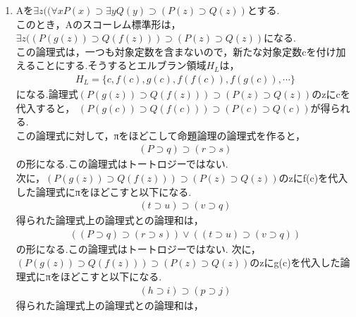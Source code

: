 \documentclass[11pt,dvipdfmx]{jreport}
\begin{document}
\begin{enumerate}
\item
Aを$\exists z ((\forall x P(x) \supset \exists y Q(y) \supset (P(z) \supset Q(z)) $とする. \\
このとき，Aのスコーレム標準形は， $ \exists z (( P(g(z)) \supset Q(f(z))) \supset (P(z) \supset Q(z))$になる.\\
この論理式は，一つも対象定数を含まないので，新たな対象定数cを付け加えることにする.そうするとエルブラン領域$H_L$は，\\
\begin{equation*}
  \begin{array}{lll}
    & H_L = \{c,f(c),g(c),f(f(c)),f(g(c)),\cdots \} & 
  \end{array}
\end{equation*}
になる.論理式$(P(g(z)) \supset Q(f(z))) \supset (P(z) \supset Q(z))$のzにcを代入すると，
$(P(g(c)) \supset Q(f(c))) \supset (P(c) \supset Q(c))$が得られる.\\
この論理式に対して，πをほどこして命題論理の論理式を作ると，
\begin{equation*}
  \begin{array}{lll}
    & (P \supset q) \supset (r \supset s) & 
  \end{array}
\end{equation*}
の形になる.この論理式はトートロジーではない.\\
次に，$(P(g(z)) \supset Q(f(z))) \supset (P(z) \supset Q(z))$のzにf(c)を代入した論理式にπをほどこすと以下になる.
\begin{equation*}
  \begin{array}{lll}
    & (t \supset u) \supset (v \supset q) & 
  \end{array}
\end{equation*}
得られた論理式上の論理式との論理和は，
\begin{equation*}
  \begin{array}{lll}
    & ((P \supset q) \supset (r \supset s)) \lor ((t \supset u) \supset (v \supset q)) & 
  \end{array}
\end{equation*}
の形になる.この論理式はトートロジーではない.
次に，$(P(g(z)) \supset Q(f(z))) \supset (P(z) \supset Q(z))$のzにg(c)を代入した論理式にπをほどこすと以下になる.
\begin{equation*}
  \begin{array}{lll}
    & (h \supset i) \supset (p \supset j) & 
  \end{array}
\end{equation*}
得られた論理式上の論理式との論理和は，

\end{enumerate}
\end{document}
